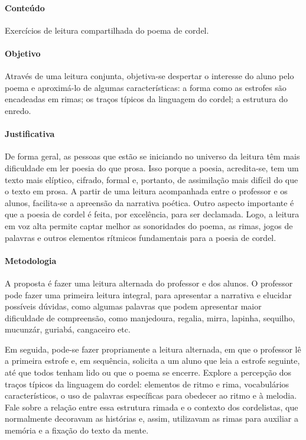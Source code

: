\documentclass[11pt]{extarticle}
\begin{document}
\paragraph{Conteúdo} Exercícios de leitura compartilhada do poema de cordel.

\paragraph{Objetivo} Através de uma leitura conjunta, objetiva-se despertar o interesse do aluno pelo poema e aproximá-lo de algumas características: a forma como as estrofes são encadeadas em rimas; os traços típicos da linguagem do cordel; a estrutura do enredo.

\paragraph{Justificativa} De forma geral, as pessoas que estão se iniciando no universo da leitura têm mais dificuldade em ler poesia do que prosa. Isso porque a poesia, acredita-se, tem um texto mais elíptico, cifrado, formal e, portanto, de assimilação mais difícil do que o texto em prosa. A partir de uma leitura acompanhada entre o professor e os alunos, facilita-se a apreensão da narrativa poética. Outro aspecto importante é que a poesia de cordel é feita, por excelência, para ser declamada. Logo, a leitura em voz alta permite captar melhor as sonoridades do poema, as rimas, jogos de palavras e outros elementos rítmicos fundamentais para a poesia de cordel.

\paragraph{Metodologia} A proposta é fazer uma leitura alternada do professor e dos alunos. O professor pode fazer uma primeira leitura integral, para apresentar a narrativa e elucidar possíveis dúvidas, como algumas palavras que podem apresentar maior dificuldade de compreensão, como manjedoura, regalia, mirra, lapinha, sequilho, mucunzár, guriabá, cangaceiro etc. 

Em seguida, pode-se fazer propriamente a leitura alternada, em que o professor lê a primeira estrofe e, em sequência, solicita a um aluno que leia a estrofe seguinte, até que todos tenham lido ou que o poema se encerre.
Explore a percepção dos traços típicos da linguagem do cordel: elementos de ritmo e rima, vocabulários característicos, o uso de palavras específicas para obedecer ao ritmo e à melodia. Fale sobre a relação entre essa estrutura rimada e o contexto dos cordelistas, que normalmente decoravam as histórias e, assim, utilizavam as rimas para auxiliar a memória e a fixação do texto da mente.
\end{document}
